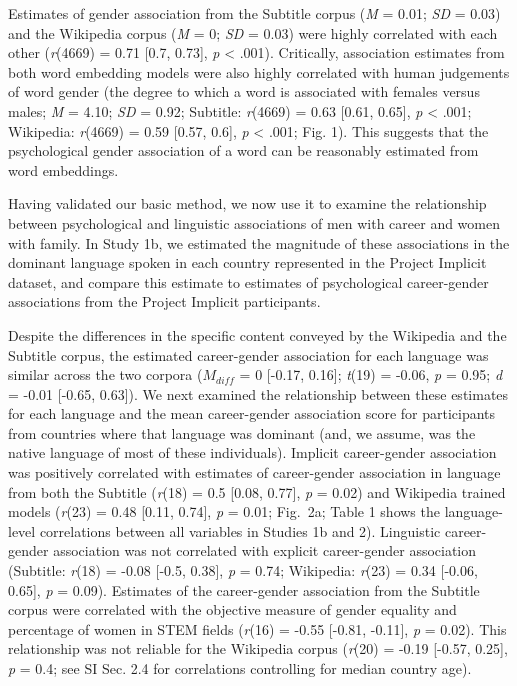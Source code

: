 \documentclass[9pt,twocolumn]{pnas-new}
\begin{document}
Estimates of gender association from the Subtitle corpus (\emph{M} = 0.01;
\emph{SD} = 0.03) and the Wikipedia corpus (\emph{M} = 0; \emph{SD} =
0.03) were highly correlated with each other (\emph{r}(4669) = 0.71 {[}0.7, 0.73{]}, \emph{p} \textless{} .001). Critically, association estimates from both word embedding
models were also highly correlated with human judgements of word gender (the degree to which a word is associated with females versus males; \emph{M} = 4.10; \emph{SD} = 0.92; Subtitle: \emph{r}(4669) = 0.63 {[}0.61, 0.65{]}, \emph{p} \textless{} .001; Wikipedia: \emph{r}(4669) = 0.59 {[}0.57, 0.6{]}, \emph{p} \textless{} .001; Fig. 1). This suggests that the psychological gender association of a word can be reasonably estimated from word embeddings.

Having validated our basic method, we now use it to examine the relationship
between psychological and linguistic associations of men with career and women with family. In Study 1b, we
estimated the magnitude of these associations in the dominant language
spoken in each country represented in the Project Implicit dataset, and
compare this estimate to estimates of psychological career-gender associations from the
Project Implicit participants.



Despite the differences in the specific content conveyed by the
Wikipedia and the Subtitle corpus, the estimated career-gender association for each
language was similar across the two corpora ($M_{diff}$ = 0 {[}-0.17, 0.16{]}; \emph{t}(19) = -0.06, \emph{p} = 0.95; \emph{d} = -0.01 {[}-0.65, 0.63{]}). We next examined the relationship between these
estimates for each language and the mean career-gender association score
for participants from countries where that language was dominant (and,
we assume, was the native language of most of these individuals).
Implicit career-gender association was positively correlated with estimates of
 career-gender association in language from both the Subtitle (\emph{r}(18) = 0.5 {[}0.08, 0.77{]}, \emph{p} = 0.02)
and Wikipedia trained models (\emph{r}(23) = 0.48 {[}0.11, 0.74{]}, \emph{p} = 0.01; Fig.\ 2a;
Table 1 shows the language-level correlations between all variables in
Studies 1b and 2). Linguistic career-gender association was
not correlated with explicit career-gender association (Subtitle: \emph{r}(18) = -0.08 {[}-0.5, 0.38{]}, \emph{p} = 0.74; Wikipedia: \emph{r}(23) = 0.34 {[}-0.06, 0.65{]}, \emph{p} = 0.09). Estimates
of the career-gender association from the Subtitle corpus were correlated with the
objective measure of gender equality and percentage of women in STEM fields
(\emph{r}(16) = -0.55 {[}-0.81, -0.11{]}, \emph{p} = 0.02). This relationship was not reliable
for the Wikipedia corpus (\emph{r}(20) = -0.19 {[}-0.57, 0.25{]}, \emph{p} = 0.4; see SI Sec. 2.4 for correlations controlling for median country age). 
\end{document}

